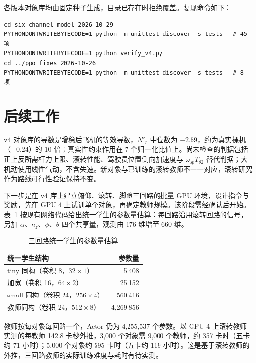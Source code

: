 \documentclass[UTF8,a4paper,11pt,fontset=fandol,scheme=plain]{ctexart}
\begin{document}
各版本对象库均由固定种子生成，目录已存在时拒绝覆盖。复现命令如下：
\begin{verbatim}
cd six_channel_model_2026-10-29
PYTHONDONTWRITEBYTECODE=1 python -m unittest discover -s tests   # 45 项
PYTHONDONTWRITEBYTECODE=1 python verify_v4.py
cd ../ppo_fixes_2026-10-26
PYTHONDONTWRITEBYTECODE=1 python -m unittest discover -s tests   # 8 项
\end{verbatim}

\section{后续工作}
\label{sec:next}
v4 对象库的导数是增稳后飞机的等效导数，\(N'_r\) 中位数为 \(-2.59\)，约为真实裸机（\(-0.24\)）的 10 倍；真实性约束作用在 7 个归一化比值上。尚未检查的判据包括正上反所需杆力上限、滚转性能、驾驶员位置侧向加速度与 \(\omega_{sp}T_{\theta2}\) 替代判据；大机动使用线性气动，不含失速。新对象与已训练的滚转教师不一一对应，滚转研究作为路线可行性验证保持不变。

下一步是在 v4 库上建立俯仰、滚转、脚蹬三回路的批量 GPU 环境，设计指令与奖励，先在 GPU 4 上试训单个对象，再确定教师规模。该阶段需经确认后开始。表~\ref{tab:size} 按现有网络代码给出统一学生的参数量估算：每回路沿用滚转回路的信号，另加 \(\alpha\)、\(n_z\)、\(\phi\)、\(\theta\) 四个共享量，观测由 176 维增至 660 维。

\begin{table}[H]
\centering\small
\caption{三回路统一学生的参数量估算}\label{tab:size}
\begin{tabular}{@{}lr@{}}
\toprule
统一学生结构 & 参数量 \\
\midrule
tiny 同构（卷积 8，\(32\times1\)） & 5,408 \\
加宽（卷积 16，\(64\times2\)） & 25,152 \\
small 同构（卷积 24，\(256\times4\)） & 560,416 \\
教师同构（卷积 24，\(512\times8\)） & 4,269,856 \\
\bottomrule
\end{tabular}
\end{table}

教师按每对象每回路一个，Actor 仍为 4,255,537 个参数。以 GPU 4 上滚转教师实测的每教师 142.8 卡秒外推，3,000 个对象需 9,000 个教师，约 357 卡时（五卡约 71 小时）；5,000 个对象约 595 卡时（五卡约 119 小时）。这是基于滚转教师的外推，三回路教师的实际训练难度与耗时有待实测。
\end{document}
